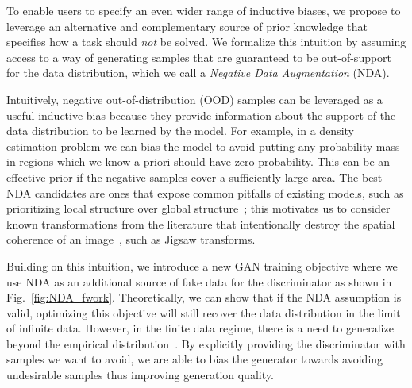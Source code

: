 \documentclass{article} \usepackage{iclr2021_conference,times}
\begin{document}
To enable users to specify an even wider range of inductive biases,  
we propose to leverage an alternative
and complementary 
source of prior knowledge that specifies how a task should \emph{not} be solved.
We formalize this intuition by assuming access to a way of generating samples that are guaranteed to be out-of-support for the data distribution, which we call a \emph{Negative Data Augmentation} (NDA). 
\begin{comment}
While task-specific, we argue that NDA samples exist and are easy to define for common data modalities such as natural images, which are 
supported on low-dimensional manifolds \citep{fefferman2016testing}.
Focusing on natural images and videos, we provide generic NDA strategies building on known transformations from the literature that intentionally destroy the spatial coherence of an image~\citep{noroozi2016unsupervised,devries2017improved,yun2019cutmix}, such as the Jigsaw puzzle transformation.
\end{comment}
Intuitively, negative out-of-distribution (OOD) samples can 
be leveraged as a useful inductive bias because they provide information about the support of the data distribution to be learned by the model.
For example, in a density estimation problem we can bias the model to avoid putting any probability mass in regions which we know a-priori should have zero probability. This can be an effective prior if the negative samples cover a sufficiently large area. 
The best NDA candidates are ones that expose common pitfalls of existing models, such as prioritizing local structure over global structure~\citep{geirhos2018imagenet}; this motivates us to consider known transformations from the literature that intentionally destroy the spatial coherence of an image~\citep{noroozi2016unsupervised,devries2017improved,yun2019cutmix}, such as Jigsaw transforms. 


Building on this intuition, we introduce a new GAN training objective where we use 
NDA as an additional source of fake data for the discriminator as shown in Fig.~\ref{fig:NDA_fwork}. 
Theoretically, we can show that if the NDA assumption  
is valid, 
optimizing this objective will still recover the data distribution in the limit of infinite data. 
However, in the finite data regime, there is a need to generalize beyond the empirical distribution~\citep{zhao2018bias}. By explicitly providing the discriminator with samples we want to avoid, we are able to bias the generator towards avoiding undesirable samples thus improving generation quality. 
\end{document}

